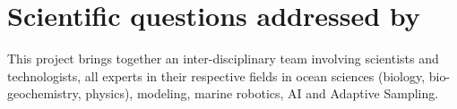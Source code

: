 \section{Scientific questions addressed by \proj}


This project brings together an inter-disciplinary team involving
scientists and technologists, all experts in their respective fields
in ocean sciences (biology, bio-geochemistry, physics), modeling,
marine robotics, AI and Adaptive Sampling.





